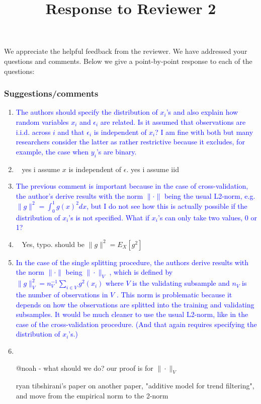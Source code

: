 \documentclass[]{article}
\title{Response to Reviewer 2}
\newcommand{\point}[1]{\item \textcolor{blue}{#1}}
\newcommand{\reply}{\item[]\ }
\begin{document}
	
	\maketitle
	
	We appreciate the helpful feedback from the reviewer. We have addressed your questions and comments. Below we give a point-by-point response to each of the questions:
	
	\subsubsection*{Suggestions/comments}
	
	\begin{enumerate}
		\point{
			The authors should specify the distribution of $x_i$'s and also explain how random variables $x_i$ and $\epsilon_i$ are related. Is it assumed that observations are i.i.d. across $i$ and that $\epsilon_i$ is independent of $x_i$? I am fine with both but many researchers consider the latter as rather restrictive because it excludes, for example, the case when $y_i$’s are binary.
		}
	
		\reply{
			yes i assume $x$ is independent of $\epsilon$.
			yes i assume iid
		}
		
		\point {
			The previous comment is important because in the case of cross-validation, the author's derive results with the norm $\| \cdot \|$ being the usual L2-norm, e.g. $\|g\|^2 = \int_0^1 g(x)^2 dx $, but I do not see how this is actually possible if the distribution of $x_i$’s is not specified. What if $x_i$’s can only take two values, 0 or 1?
		}
	
		\reply{
			Yes, typo. should be $\|g\|^2 = E_X[g^2]$
		}
		
	
		\point{
			In the case of the single splitting procedure, the authors derive results with the norm $\|\cdot\|$ being $\|\cdot\|_V$ , which is defined by $\|g \|_V^2 = n_V^{-1} \sum_{i\in V} g^2(x_i)$ where $V$ is the validating subsample and $n_V$ is the number of observations in $V$ . This norm is problematic because it depends on how the observations are splitted into the training and validating subsamples. It would be much cleaner to use the usual L2-norm, like in the case of the cross-validation procedure. (And that again requires specifying the distribution of $x_i$’s.)
		}
	
		\reply{
			@noah - what should we do? our proof is for $\|\cdot\|_V$
			
			ryan tibshirani's paper on another paper, "additive model for trend filtering", and move from the empirical norm to the 2-norm
			
}
\end{enumerate}
\end{document}
